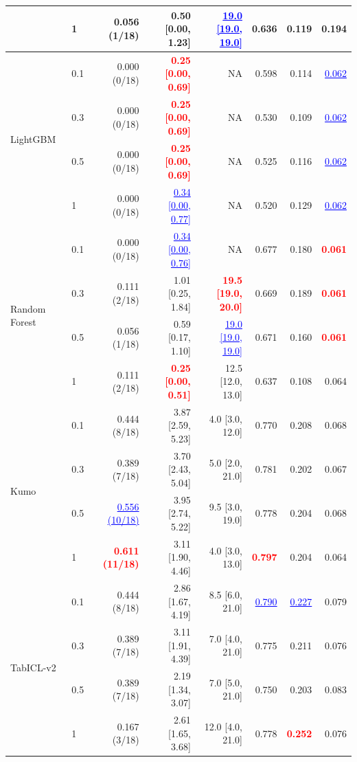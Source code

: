 \begin{table}[pos=!htbp,align=\centering]
{\begin{tabular}{llrrrrrr}
 & 1 & 0.056 (1/18) & 0.50 [0.00, 1.23] & \textcolor{blue}{\underline{19.0 [19.0, 19.0]}} & 0.636 & 0.119 & 0.194 \\
\midrule
\multirow{4}{*}{LightGBM} & 0.1 & 0.000 (0/18) & \textcolor{red}{\textbf{0.25 [0.00, 0.69]}} & NA & 0.598 & 0.114 & \textcolor{blue}{\underline{0.062}} \\
 & 0.3 & 0.000 (0/18) & \textcolor{red}{\textbf{0.25 [0.00, 0.69]}} & NA & 0.530 & 0.109 & \textcolor{blue}{\underline{0.062}} \\
 & 0.5 & 0.000 (0/18) & \textcolor{red}{\textbf{0.25 [0.00, 0.69]}} & NA & 0.525 & 0.116 & \textcolor{blue}{\underline{0.062}} \\
 & 1 & 0.000 (0/18) & \textcolor{blue}{\underline{0.34 [0.00, 0.77]}} & NA & 0.520 & 0.129 & \textcolor{blue}{\underline{0.062}} \\
\midrule
\multirow{4}{*}{Random Forest} & 0.1 & 0.000 (0/18) & \textcolor{blue}{\underline{0.34 [0.00, 0.76]}} & NA & 0.677 & 0.180 & \textcolor{red}{\textbf{0.061}} \\
 & 0.3 & 0.111 (2/18) & 1.01 [0.25, 1.84] & \textcolor{red}{\textbf{19.5 [19.0, 20.0]}} & 0.669 & 0.189 & \textcolor{red}{\textbf{0.061}} \\
 & 0.5 & 0.056 (1/18) & 0.59 [0.17, 1.10] & \textcolor{blue}{\underline{19.0 [19.0, 19.0]}} & 0.671 & 0.160 & \textcolor{red}{\textbf{0.061}} \\
 & 1 & 0.111 (2/18) & \textcolor{red}{\textbf{0.25 [0.00, 0.51]}} & 12.5 [12.0, 13.0] & 0.637 & 0.108 & 0.064 \\
\midrule
\multirow{4}{*}{Kumo} & 0.1 & 0.444 (8/18) & 3.87 [2.59, 5.23] & 4.0 [3.0, 12.0] & 0.770 & 0.208 & 0.068 \\
 & 0.3 & 0.389 (7/18) & 3.70 [2.43, 5.04] & 5.0 [2.0, 21.0] & 0.781 & 0.202 & 0.067 \\
 & 0.5 & \textcolor{blue}{\underline{0.556 (10/18)}} & 3.95 [2.74, 5.22] & 9.5 [3.0, 19.0] & 0.778 & 0.204 & 0.068 \\
 & 1 & \textcolor{red}{\textbf{0.611 (11/18)}} & 3.11 [1.90, 4.46] & 4.0 [3.0, 13.0] & \textcolor{red}{\textbf{0.797}} & 0.204 & 0.064 \\
\midrule
\multirow{4}{*}{TabICL-v2} & 0.1 & 0.444 (8/18) & 2.86 [1.67, 4.19] & 8.5 [6.0, 21.0] & \textcolor{blue}{\underline{0.790}} & \textcolor{blue}{\underline{0.227}} & 0.079 \\
 & 0.3 & 0.389 (7/18) & 3.11 [1.91, 4.39] & 7.0 [4.0, 21.0] & 0.775 & 0.211 & 0.076 \\
 & 0.5 & 0.389 (7/18) & 2.19 [1.34, 3.07] & 7.0 [5.0, 21.0] & 0.750 & 0.203 & 0.083 \\
 & 1 & 0.167 (3/18) & 2.61 [1.65, 3.68] & 12.0 [4.0, 21.0] & 0.778 & \textcolor{red}{\textbf{0.252}} & 0.076 \\
\bottomrule
\end{tabular}
}
\end{table}
